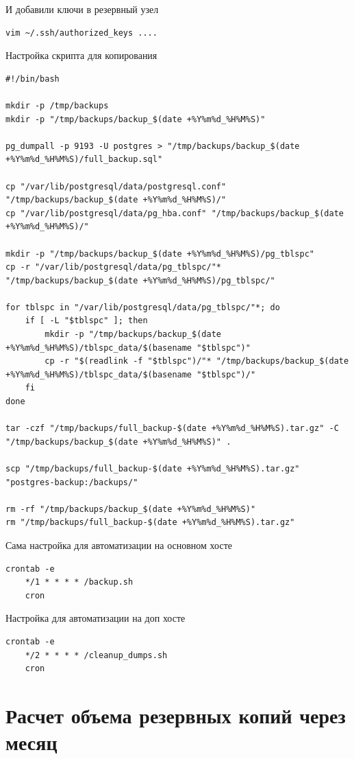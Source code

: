 \documentclass{article}
\begin{document}
И добавили ключи в резервный узел
\begin{lstlisting}[caption={kitty}, label={lst:example}]
    vim ~/.ssh/authorized_keys ....
\end{lstlisting}

Настройка скрипта для копирования
\begin{lstlisting}[caption={kitty}, label={lst:example}]
#!/bin/bash

mkdir -p /tmp/backups
mkdir -p "/tmp/backups/backup_$(date +%Y%m%d_%H%M%S)"

pg_dumpall -p 9193 -U postgres > "/tmp/backups/backup_$(date +%Y%m%d_%H%M%S)/full_backup.sql"

cp "/var/lib/postgresql/data/postgresql.conf" "/tmp/backups/backup_$(date +%Y%m%d_%H%M%S)/"
cp "/var/lib/postgresql/data/pg_hba.conf" "/tmp/backups/backup_$(date +%Y%m%d_%H%M%S)/"

mkdir -p "/tmp/backups/backup_$(date +%Y%m%d_%H%M%S)/pg_tblspc"
cp -r "/var/lib/postgresql/data/pg_tblspc/"* "/tmp/backups/backup_$(date +%Y%m%d_%H%M%S)/pg_tblspc/" 

for tblspc in "/var/lib/postgresql/data/pg_tblspc/"*; do
    if [ -L "$tblspc" ]; then
        mkdir -p "/tmp/backups/backup_$(date +%Y%m%d_%H%M%S)/tblspc_data/$(basename "$tblspc")"
        cp -r "$(readlink -f "$tblspc")/"* "/tmp/backups/backup_$(date +%Y%m%d_%H%M%S)/tblspc_data/$(basename "$tblspc")/"
    fi
done

tar -czf "/tmp/backups/full_backup-$(date +%Y%m%d_%H%M%S).tar.gz" -C "/tmp/backups/backup_$(date +%Y%m%d_%H%M%S)" .

scp "/tmp/backups/full_backup-$(date +%Y%m%d_%H%M%S).tar.gz" "postgres-backup:/backups/"

rm -rf "/tmp/backups/backup_$(date +%Y%m%d_%H%M%S)"
rm "/tmp/backups/full_backup-$(date +%Y%m%d_%H%M%S).tar.gz"    
\end{lstlisting}

Сама настройка для автоматизации на основном хосте
\begin{lstlisting}[caption={kitty}, label={lst:example}]
    crontab -e 
    */1 * * * * /backup.sh
    cron
\end{lstlisting}

Настройка для автоматизации на доп хосте
\begin{lstlisting}[caption={kitty}, label={lst:example}]
    crontab -e 
    */2 * * * * /cleanup_dumps.sh
    cron
\end{lstlisting}

\section*{Расчет объема резервных копий через месяц}
\end{document}
